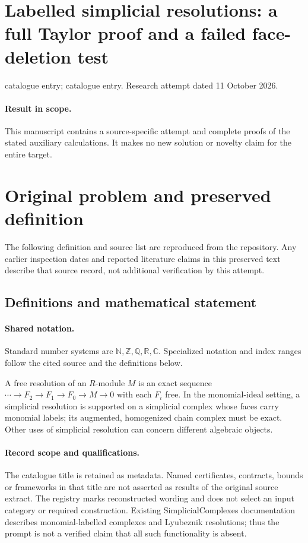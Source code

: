 \documentclass[11pt]{article}
\begin{document}
\section*{Labelled simplicial resolutions: a full Taylor proof and a failed face-deletion test}
\noindent catalogue entry; catalogue entry. Research attempt dated 11 October 2026.
\paragraph{Result in scope.}This manuscript contains a source-specific attempt and complete proofs of the stated auxiliary calculations. It makes no new solution or novelty claim for the entire target.
\section{Original problem and preserved definition}
The following definition and source list are reproduced from the repository. Any earlier inspection dates and reported literature claims in this preserved text describe that source record, not additional verification by this attempt.
\subsection{Definitions and mathematical statement}

\paragraph{Shared notation.}Standard number systems are $\mathbb N,\mathbb Z,\mathbb Q,\mathbb R,\mathbb C$. Specialized notation and index ranges follow the cited source and the definitions below.


A free resolution of an $R$-module $M$ is an exact sequence $\cdots\to F_2\to F_1\to F_0\to M\to0$ with each $F_i$ free. In the monomial-ideal setting, a simplicial resolution is supported on a simplicial complex whose faces carry monomial labels; its augmented, homogenized chain complex must be exact. Other uses of simplicial resolution can concern different algebraic objects.
\paragraph{Record scope and qualifications.}
The catalogue title is retained as metadata. Named certificates, contracts, bounds or frameworks in that title are not asserted as results of the original source extract.
The registry marks reconstructed wording and does not select an input category or required construction. Existing SimplicialComplexes documentation describes monomial-labelled complexes and Lyubeznik resolutions; thus the prompt is not a verified claim that all such functionality is absent.
\end{document}
